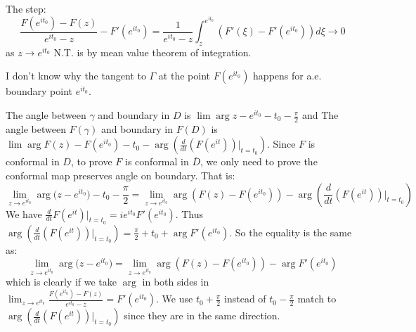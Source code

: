 \begin{remark}
    The step:
    \begin{equation*}
        \frac{F(e^{it_0})-F(z)}{e^{it_0}-z}-F'(e^{it_0})= \frac{1}{e^{it_0}-z}\int_z^{e^{it_0}}{(F'(\xi)-F'(e^{it_0}))d\xi}\to 0
    \end{equation*}
    as $z\to e^{it_0}$ N.T. is {\color{blue}by mean value theorem of integration}.\par
    {\color{blue}I don't know why the tangent to $\Gamma$ at the point $F(e^{it_0})$ happens for a.e. boundary point $e^{it_0}$}.\par
    The angle between $\gamma$ and boundary in $D$ is $\lim{\arg{z-e^{it_0}}}-t_0-\frac{\pi}{2}$ and
    The angle between $F(\gamma)$ and boundary in $F(D)$ is $\lim{\arg{F(z)-F(e^{it_0})}}-t_0-\arg{(\frac{d}{dt}(F(e^{it}))\vert_{t=t_0})}$.
    Since $F$ is conformal in $D$, to prove $F$ is conformal in $\bar{D}$, we only need to prove the conformal map preserves angle on boundary.
    That is:
    \begin{equation*}
        \lim_{z\to e^{it_0}}{\arg{(z-e^{it_0}})}-t_0-\frac{\pi}{2}=\lim_{z\to e^{it_0}}{\arg{(F(z)-F(e^{it_0}))}}-\arg{(\frac{d}{dt}(F(e^{it}))\vert_{t=t_0})}
    \end{equation*}
    We have $\frac{d}{dt}F(e^{it})\vert_{t=t_0}=ie^{it_0}F'(e^{it_0})$. Thus $\arg{(\frac{d}{dt}(F(e^{it}))\vert_{t=t_0})}=\frac{\pi}{2}+t_0+\arg{F'(e^{it_0})}$. So the equality is the same as:
    \begin{equation*}
        \lim_{z\to e^{it_0}}{\arg{(z-e^{it_0}})}=\lim_{z\to e^{it_0}}{\arg{(F(z)-F(e^{it_0}))}}-\arg{F'(e^{it_0})}
    \end{equation*}
    which is clearly if we take $\arg$ in both sides in $\lim_{z\to e^{it_0}}\frac{F(e^{it_0})-F(z)}{e^{it_0}-z}=F'(e^{it_0})$.
    We use $t_0+\frac{\pi}{2}$ instead of $t_0-\frac{\pi}{2}$ match to $\arg{(\frac{d}{dt}(F(e^{it}))\vert_{t=t_0})}$ since they are in the same direction.
\end{remark}
% 

